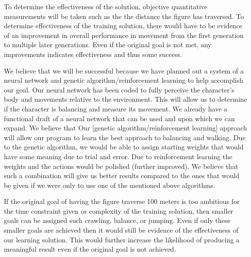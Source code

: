 \documentclass[letterpaper]{article} %
\begin{document}
To determine the effectiveness of the solution, objective quantitative measurements will be taken such as the the distance the figure has traversed. To determine effectiveness of the training solution, there would have to be evidence of an improvement in overall performance in movement from the first generation to multiple later generations. Even if the original goal is not met, any improvements indicates effectiveness and thus some success.

We believe that we will be successful because we have planned out a system of a neural network and genetic algorithm/reinforcement learning to help accomplish our goal. Our neural network has been coded to fully perceive the character's body and movements relative to the environment. This will allow us to determine if the character is balancing and measure its movement. We already have a functional draft of a neural network that can be used and upon which we can expand. We believe that Our [genetic algorithm/reinforcement learning] approach will allow our program to learn the best approach to balancing and walking. Due to the genetic algorithm, we would be able to assign starting weights that would have some meaning due to trial and error. Due to reinforcement learning the weights and the actions would be polished (further improved). We believe that such a combination will give us better results compared to the ones that would be given if we were only to use one of the mentioned above algorithms.

If the original goal of having the figure traverse 100 meters is too ambitious for the time constraint given or complexity of the training solution, then smaller goals can be assigned such crawling, balance, or jumping. Even if only these smaller goals are achieved then it would still be evidence of the effectiveness of our learning solution. This would further increase the likelihood of producing a meaningful result even if the original goal is not achieved.
\end{document}
